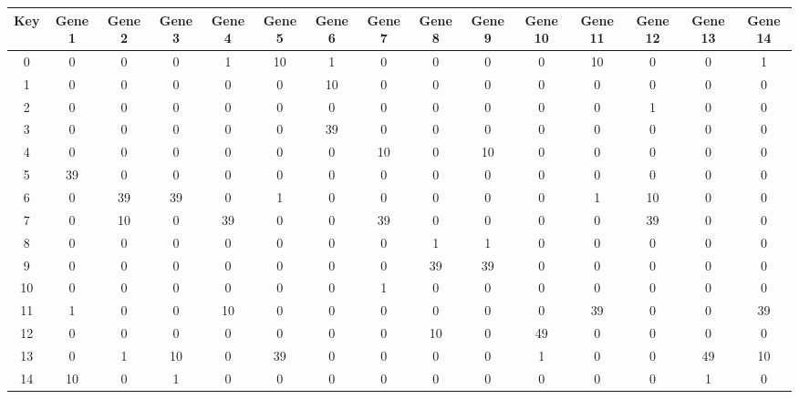 \begin{tabular}{|c|c|c|c|c|c|c|c|c|c|c|c|c|c|c|}
\hline
Key & Gene 1 & Gene 2 & Gene 3 & Gene 4 & Gene 5 & Gene 6 & Gene 7 & Gene 8 & Gene 9 & Gene 10 & Gene 11 & Gene 12 & Gene 13 & Gene 14 \\
\hline
0 & 0 & 0 & 0 & 1 & 10 & 1 & 0 & 0 & 0 & 0 & 10 & 0 & 0 & 1 \\
1 & 0 & 0 & 0 & 0 & 0 & 10 & 0 & 0 & 0 & 0 & 0 & 0 & 0 & 0 \\
2 & 0 & 0 & 0 & 0 & 0 & 0 & 0 & 0 & 0 & 0 & 0 & 1 & 0 & 0 \\
3 & 0 & 0 & 0 & 0 & 0 & 39 & 0 & 0 & 0 & 0 & 0 & 0 & 0 & 0 \\
4 & 0 & 0 & 0 & 0 & 0 & 0 & 10 & 0 & 10 & 0 & 0 & 0 & 0 & 0 \\
5 & 39 & 0 & 0 & 0 & 0 & 0 & 0 & 0 & 0 & 0 & 0 & 0 & 0 & 0 \\
6 & 0 & 39 & 39 & 0 & 1 & 0 & 0 & 0 & 0 & 0 & 1 & 10 & 0 & 0 \\
7 & 0 & 10 & 0 & 39 & 0 & 0 & 39 & 0 & 0 & 0 & 0 & 39 & 0 & 0 \\
8 & 0 & 0 & 0 & 0 & 0 & 0 & 0 & 1 & 1 & 0 & 0 & 0 & 0 & 0 \\
9 & 0 & 0 & 0 & 0 & 0 & 0 & 0 & 39 & 39 & 0 & 0 & 0 & 0 & 0 \\
10 & 0 & 0 & 0 & 0 & 0 & 0 & 1 & 0 & 0 & 0 & 0 & 0 & 0 & 0 \\
11 & 1 & 0 & 0 & 10 & 0 & 0 & 0 & 0 & 0 & 0 & 39 & 0 & 0 & 39 \\
12 & 0 & 0 & 0 & 0 & 0 & 0 & 0 & 10 & 0 & 49 & 0 & 0 & 0 & 0 \\
13 & 0 & 1 & 10 & 0 & 39 & 0 & 0 & 0 & 0 & 1 & 0 & 0 & 49 & 10 \\
14 & 10 & 0 & 1 & 0 & 0 & 0 & 0 & 0 & 0 & 0 & 0 & 0 & 1 & 0 \\
\hline
\end{tabular}